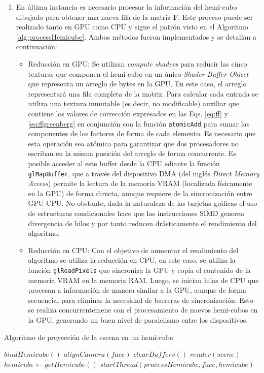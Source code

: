 \begin{enumerate}
\begin{enumerate}
	\end{enumerate}
	\item En última instancia es necesario procesar la información del hemi-cubo dibujado para obtener una nueva fila de la matriz $\mathbf{F}$. Este proceso puede ser realizado tanto en GPU como CPU y sigue el patrón visto en el Algoritmo \ref{alg:processHemicube}. Ambos métodos fueron implementados y se detallan a continuación:
	\begin{itemize}
		\item Reducción en GPU: Se utilizan \textit{compute shaders} para reducir las cinco texturas que componen el hemi-cubo en un único \textit{Shader Buffer Object} que representa un arreglo de bytes en la GPU. En este caso, el arreglo representará una fila completa de la matriz. Para calcular cada entrada se utiliza una textura inmutable (es decir, no modificable) auxiliar que contiene los valores de corrección expresados en las Eqs. \eqref{eq:ff} y \eqref{eq:ffgreenberg} en conjunción con la función \verb|atomicAdd| para sumar las componentes de los factores de forma de cada elemento. Es necesario que esta operación sea atómica para garantizar que dos procesadores no escriban en la misma posición del arreglo de forma concurrente.
		Es posible acceder al este buffer desde la CPU ediante la función \verb|glMapBuffer|, que a través del dispositivo DMA (del inglés \textit{Direct Memory Access}) permite la lectura de la memoria VRAM (localizada físicamente en la GPU) de forma directa, aunque requiere de la sincronización entre GPU-CPU.
		No obstante, dada la naturaleza de las tarjetas gráficas el uso de estructuras condicionales hace que las instrucciones SIMD generen divergencia de hilos y por tanto reducen drásticamente el rendimiento del algoritmo.
		\item Reducción en CPU: Con el objetivo de aumentar el rendimiento del algoritmo se utiliza la reducción en CPU, en este caso, se utiliza la función \verb|glReadPixels| que sincroniza la GPU y copia el contenido de la memoria VRAM en la memoria RAM. Luego, se inician hilos de CPU que procesan a información de manera similar a la GPU, aunque de forma secuencial para eliminar la necesidad de barreras de sincronización.  Esto se realiza concurrentemene con el procesamiento de nuevos hemi-cubos en la GPU, generando un buen nivel de paralelismo entre los dispositivos.
	\end{itemize}
 \end{enumerate}

\begin{algorithm}
	\caption{Algoritmo de proyección de la escena en un hemi-cubo}
	\label{alg:renderHemicube}	
	\begin{algorithmic}
		\State $bindHemicube()$
		\State $alignCamera(face)$
		\State $clearBuffers()$
		\State $render(scene)$
		\State $hemicube \gets getHemicube()$
		\State $startThread(processHemicube, face, hemicube)$
		\EndLoop
		\EndFunction
	\end{algorithmic}
\end{algorithm}

